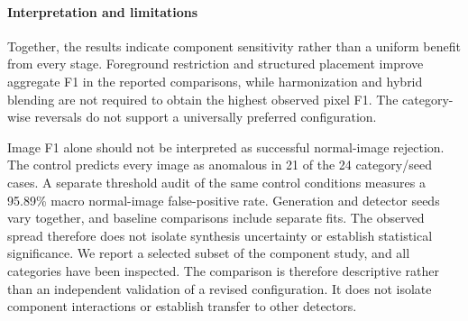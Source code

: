 \paragraph{Interpretation and limitations}

Together, the results indicate component sensitivity rather than a uniform benefit from
every stage.
Foreground restriction and structured placement improve aggregate F1 in
the reported comparisons, while harmonization and hybrid blending are
not required to obtain the highest observed pixel F1.
The category-wise reversals do not support a universally preferred
configuration.

Image F1 alone should not be interpreted as successful normal-image
rejection.
The control predicts every image as anomalous in 21 of the 24
category/seed cases.
A separate threshold audit of the same control conditions measures a
95.89\% macro normal-image false-positive rate.
Generation and detector seeds vary together, and baseline comparisons
include separate fits.
The observed spread therefore does not isolate synthesis uncertainty or
establish statistical significance.
We report a selected subset of the component study, and all categories
have been inspected.
The comparison is therefore descriptive rather than an independent
validation of a revised configuration.
It does not isolate component interactions or establish transfer to other
detectors.
